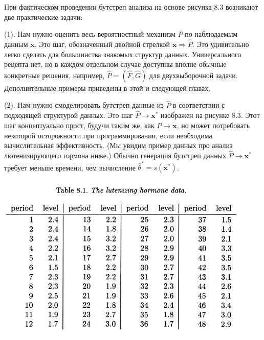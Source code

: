 При фактическом проведении бутстреп анализа на основе рисунка 8.3 возникают две практические задачи:

(1). Нам нужно оценить весь вероятностный механизм $P$ по наблюдаемым данным $\textbf{x}$. Это шаг, обозначенный двойной стрелкой $\textbf{x} \Rightarrow \hat{P}$. Это удивительно легко сделать для большинства знакомых структур данных. Универсального рецепта нет, но в каждом отдельном случае доступны вполне обычные конкретные решения, например, $\hat{P} = (\hat{F}, \hat{G})$ для двухвыборочной задачи. Дополнительные примеры приведены в этой и следующей главах.

(2). Нам нужно смоделировать бутстреп данные из $\hat{P}$ в соответствии с подходящей структурой данных. Это шаг $\hat{P} \to \textbf{x}^*$ изображен на рисунке 8.3. Этот шаг концептуально прост, будучи таким же, как $P \to \textbf{x}$, но может потребовать некоторой осторожности при программировании, если необходима вычислительная эффективность. (Мы увидим пример данных про анализ лютенизирующего гормона ниже.) Обычно генерация бутстреп данных $\hat{P} \to \textbf{x}^*$ требует меньше времени, чем вычисление $\hat{\theta}^* = s(\textbf{x}^*)$.

\noindent
\includegraphics[width=12cm]{8/t81}\\